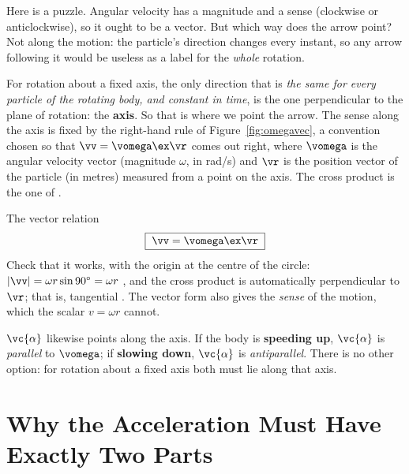 Here is a puzzle. Angular velocity has a magnitude and a sense (clockwise or anticlockwise), so it
ought to be a vector. But which way does the arrow point? Not along the motion: the particle's
direction changes every instant, so any arrow following it would be useless as a label for the
\emph{whole} rotation.

For rotation about a fixed axis, the only direction that is \emph{the same for every particle of the
rotating body, and constant in time}, is the one perpendicular to the plane of rotation: the
\textbf{axis}. So that is where we point the arrow. The sense along the axis is fixed by the right-hand
rule of Figure~\ref{fig:omegavec}, a convention chosen so that $\vv=\vomega\ex\vr$ comes out right, where $\vomega$ is the angular velocity vector (magnitude $\omega$, in \si{rad/s}) and $\vr$ is the position vector of the particle (in metres) measured from a point on the axis. The cross product is the one of .


\begin{figure}[htbp]
\centering
{}
\end{figure}

\begin{keybox}{The vector relation}
\[
\boxed{\;\vv=\vomega\ex\vr\;}
\]
Check that it works, with the origin at the centre of the circle:
$|\vv|=\omega r\sin90^\circ=\omega r$ \checkmark, and the cross product is
automatically perpendicular to $\vr$; that is, tangential \checkmark. The vector form also gives the
\emph{sense} of the motion, which the scalar $v=\omega r$ cannot.

\medskip
$\vc{\alpha}$ likewise points along the axis. If the body is \textbf{speeding up}, $\vc{\alpha}$ is
\emph{parallel} to $\vomega$; if \textbf{slowing down}, $\vc{\alpha}$ is \emph{antiparallel}. There is no
other option: for rotation about a fixed axis both must lie along that axis.
\end{keybox}

\section{Why the Acceleration Must Have Exactly Two Parts}\label{sec:twoparts}

